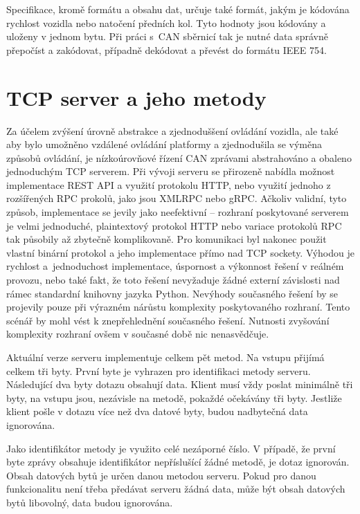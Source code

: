 \documentclass[czech, bachelor]{diploma}
\begin{document}
Specifikace, kromě formátu a obsahu dat, určuje také formát, jakým je kódována rychlost vozidla nebo natočení předních kol. Tyto
hodnoty jsou kódovány a uloženy v jednom bytu. Při práci s~CAN sběrnicí tak je nutné data správně přepočíst a zakódovat, případně
dekódovat a převést do formátu IEEE 754.

\section{TCP server a jeho metody} \label{server-methods}

Za účelem zvýšení úrovně abstrakce a zjednoduššení ovládání vozidla, ale také aby bylo umožněno vzdálené ovládání platformy
a zjednodušila se výměna způsobů ovládání, je nízkoúrovňové řízení CAN zprávami abstrahováno a obaleno jednoduchým TCP serverem.
Při vývoji serveru se přirozeně nabídla možnost implementace REST API a využití protokolu HTTP, nebo využití jednoho z rozšířených
RPC prokolů, jako jsou XMLRPC nebo gRPC. Ačkoliv validní, tyto způsob, implementace se jevily jako neefektivní -- rozhraní
poskytované serverem je velmi jednoduché, plaintextový protokol HTTP nebo variace protokolů RPC tak působily až zbytečně
komplikovaně. Pro komunikaci byl nakonec použit vlastní binární protokol a jeho implementace přímo nad TCP sockety.
Výhodou je rychlost a~jednoduchost implementace, úspornost a výkonnost řešení v reálném provozu, nebo také fakt, že toto řešení
nevyžaduje žádné externí závislosti nad rámec standardní knihovny jazyka Python. Nevýhody současného řešení by se projevily
pouze při výrazném nárůstu komplexity poskytovaného rozhraní. Tento scénář by mohl vést k znepřehlednění současného řešení.
Nutnosti zvyšování komplexity rozhraní ovšem v současné době nic nenasvědčuje.

Aktuální verze serveru implementuje celkem pět metod. Na vstupu přijímá celkem tři byty. První byte je vyhrazen pro identifikaci
metody serveru. Následující dva byty dotazu obsahují data. Klient musí vždy poslat minimálně tři byty, na vstupu jsou, nezávisle
na metodě, pokaždé očekávány tři byty. Jestliže klient pošle v dotazu více než dva datové byty, budou nadbytečná data ignorována.

Jako identifikátor metody je využito celé nezáporné číslo. V případě, že první byte zprávy obsahuje identifikátor nepříslušící
žádné metodě, je dotaz ignorován. Obsah datových bytů je určen danou metodou serveru. Pokud pro danou funkcionalitu není třeba
předávat serveru žádná data, může být obsah datových bytů libovolný, data budou ignorována.
\end{document}
